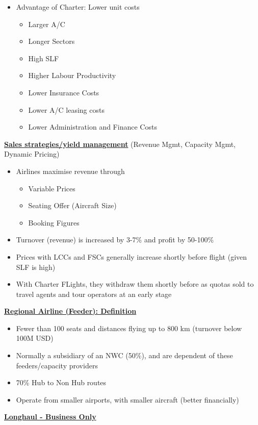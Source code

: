 \documentclass[9pt, landscape, fleqn]{scrartcl}
\begin{document}
\begin{multicols*}{3}
\begin{itemize}
    \item Advantage of Charter: Lower unit costs
    \begin{itemize}
        \item Larger A/C 
        \item Longer Sectors 
        \item High SLF 
        \item Higher Labour Productivity 
        \item Lower Insurance Costs 
        \item Lower A/C leasing costs 
        \item Lower Administration and Finance Costs 
    \end{itemize}
\end{itemize}
\underline{\textbf{Sales strategies/yield management}} (Revenue Mgmt, Capacity Mgmt, Dynamic Pricing)
\begin{itemize}
    \item Airlines maximise revenue through 
    \begin{itemize}
        \item Variable Prices 
        \item Seating Offer (Aircraft Size)
        \item Booking Figures
    \end{itemize}
    \item Turnover (revenue) is increased by 3-7\% and profit by 50-100\%
    \item Prices with LCCs and FSCs generally increase shortly before flight (given SLF is high)
    \item With Charter FLights, they withdraw them shortly before as quotas sold to travel agents and tour operators at an early stage
\end{itemize}
\underline{\textbf{Regional Airline (Feeder): Definition}}
\begin{itemize}
    \item Fewer than 100 seats and distances flying up to 800 km (turnover below 100M USD)
    \item Normally a subsidiary of an NWC (50\%), and are dependent of these feeders/capacity providers
    \item 70\% Hub to Non Hub routes
    \item Operate from smaller airports, with smaller aircraft (better financially)
\end{itemize}
\underline{\textbf{Longhaul - Business Only}}
\begin{itemize}

\end{itemize}
\end{multicols*}
\end{document}
